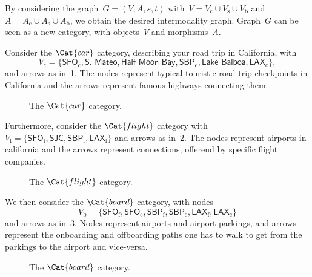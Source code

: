 By considering the graph~$G=(V,A,s,t)$ with~$V=V_\mathrm{c}\cup V_\mathrm{s}\cup V_\mathrm{b}$ and~$A=A_\mathrm{c}\cup A_\mathrm{s}\cup A_\mathrm{b}$, we obtain the desired intermodality graph. Graph~$G$ can be seen as a new category, with objects~$V$ and morphisms~$A$.
\begin{example}
Consider the $\Cat{car}$ category, describing your road trip in California, with
\begin{equation*}
    V_\mathrm{c}=\{\textsf{SFO}_\mathrm{c},\textsf{S. Mateo},\textsf{Half Moon Bay},\textsf{SBP}_\mathrm{c},\textsf{Lake Balboa},\textsf{LAX}_\mathrm{c}\},
\end{equation*}
and arrows as in~\cref{fig:carcat}. The nodes represent typical touristic road-trip checkpoints in California and the arrows represent famous highways connecting them.

\begin{figure}[h!]
\begin{center}
\end{center}
\caption{The $\Cat{car}$ category. \label{fig:carcat}}
\end{figure}

Furthermore, consider the $\Cat{flight}$ category with $V_\mathrm{f}=\{\textsf{SFO}_\mathrm{f}, \textsf{SJC}, \textsf{SBP}_\mathrm{f}, \textsf{LAX}_\mathrm{f}\}$ and arrows as in~\cref{fig:flight}. The nodes represent airports in california and the arrows represent connections, offerend by specific flight companies.

\begin{figure}[h!]
\begin{center}
\end{center}
\caption{The $\Cat{flight}$ category. \label{fig:flight}}
\end{figure}

We then consider the $\Cat{board}$ category, with nodes
\begin{equation*}
    V_\mathrm{b}=\{\textsf{SFO}_\mathrm{f},\textsf{SFO}_\mathrm{c},\textsf{SBP}_\mathrm{f},\textsf{SBP}_\mathrm{c},\textsf{LAX}_\mathrm{f},\textsf{LAX}_\mathrm{c}\}
\end{equation*}
and arrows as in~\cref{fig:boarding}. Nodes represent airports and airport parkings, and arrows represent the onboarding and offboarding paths one has to walk to get from the parkings to the airport and vice-versa.

\begin{figure}[h!]
\begin{center}
\end{center}
\caption{The $\Cat{board}$ category. \label{fig:boarding}}
\end{figure}


\end{example}
